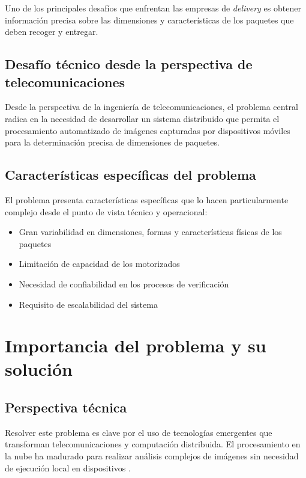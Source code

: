 Uno de los principales desafíos que enfrentan las empresas de \textit{delivery} es obtener información precisa sobre las dimensiones y características de los paquetes que deben recoger y entregar.

\subsection{Desafío técnico desde la perspectiva de telecomunicaciones}

Desde la perspectiva de la ingeniería de telecomunicaciones, el problema central radica en la necesidad de desarrollar un sistema distribuido que permita el procesamiento automatizado de imágenes capturadas por dispositivos móviles para la determinación precisa de dimensiones de paquetes.

\subsection{Características específicas del problema}

El problema presenta características específicas que lo hacen particularmente complejo desde el punto de vista técnico y operacional:

\begin{itemize}
    \item Gran variabilidad en dimensiones, formas y características físicas de los paquetes
    \item Limitación de capacidad de los motorizados
    \item Necesidad de confiabilidad en los procesos de verificación
    \item Requisito de escalabilidad del sistema
\end{itemize}

\section{Importancia del problema y su solución}

\subsection{Perspectiva técnica}

Resolver este problema es clave por el uso de tecnologías emergentes que transforman telecomunicaciones y computación distribuida. El procesamiento en la nube ha madurado para realizar análisis complejos de imágenes sin necesidad de ejecución local en dispositivos \cite{Xu2012,Wang2012}.

